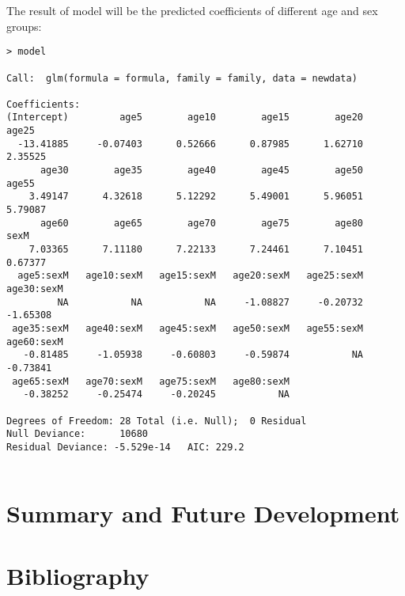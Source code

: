 \documentclass{article}
\begin{document}
The result of model will be the predicted coefficients of different age and sex groups:
\begin{verbatim}
> model

Call:  glm(formula = formula, family = family, data = newdata)

Coefficients:
(Intercept)         age5        age10        age15        age20        age25
  -13.41885     -0.07403      0.52666      0.87985      1.62710      2.35525
      age30        age35        age40        age45        age50        age55
    3.49147      4.32618      5.12292      5.49001      5.96051      5.79087
      age60        age65        age70        age75        age80         sexM
    7.03365      7.11180      7.22133      7.24461      7.10451      0.67377
  age5:sexM   age10:sexM   age15:sexM   age20:sexM   age25:sexM   age30:sexM
         NA           NA           NA     -1.08827     -0.20732     -1.65308
 age35:sexM   age40:sexM   age45:sexM   age50:sexM   age55:sexM   age60:sexM
   -0.81485     -1.05938     -0.60803     -0.59874           NA     -0.73841
 age65:sexM   age70:sexM   age75:sexM   age80:sexM
   -0.38252     -0.25474     -0.20245           NA

Degrees of Freedom: 28 Total (i.e. Null);  0 Residual
Null Deviance:      10680
Residual Deviance: -5.529e-14   AIC: 229.2


\end{verbatim}



\section{Summary and Future Development}

\section{Bibliography}
\end{document}
